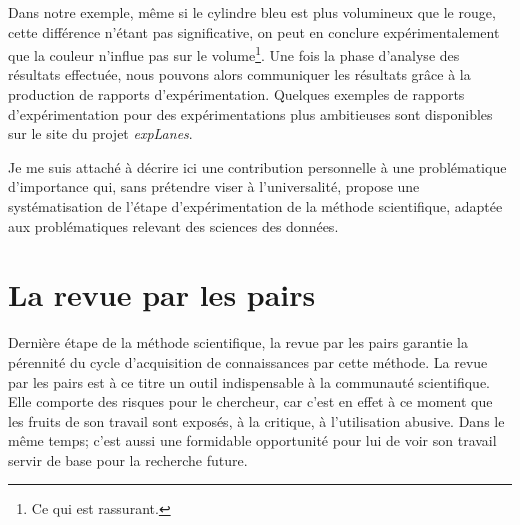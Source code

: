 
Dans notre exemple, même si le cylindre bleu est plus volumineux que le rouge, cette différence n'étant pas significative, on peut en conclure expérimentalement que la couleur n'influe pas sur le volume\footnote{Ce qui est rassurant.}. Une fois la phase d'analyse des résultats effectuée, nous pouvons alors communiquer les résultats grâce à la production de rapports d'expérimentation. Quelques exemples de rapports d'expérimentation pour des expérimentations plus ambitieuses sont disponibles sur le site du projet \textsl{expLanes}.

Je me suis attaché à décrire ici une contribution personnelle à une problématique d'importance qui, sans prétendre viser à l'universalité, propose une systématisation de l'étape d'expérimentation de la méthode scientifique, adaptée aux problématiques relevant des sciences des données.


\section{\nmu La revue par les pairs} \label{sec:pairs}

Dernière étape de la méthode scientifique, la revue par les pairs garantie la pérennité du cycle d'acquisition de connaissances par cette méthode. La revue par les pairs est à ce titre un outil indispensable à la communauté scientifique. Elle comporte des risques pour le chercheur, car c'est en effet à ce moment que les fruits de son travail sont exposés, à la critique, à l'utilisation abusive. Dans le même temps; c'est aussi une formidable opportunité pour lui de voir son travail servir de base pour la recherche future.

